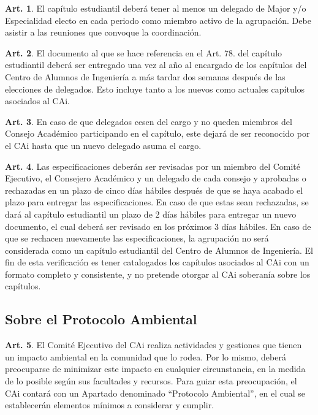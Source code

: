 \documentclass[letterpaper,11pt]{article}
\theoremstyle{definition}%
\newtheorem{art}{Art.} %
\begin{document}
\begin{art}
	El capítulo estudiantil deberá tener al menos un delegado de Major y/o Especialidad electo en cada periodo como miembro activo de la agrupación. Debe asistir a las reuniones que convoque la coordinación.
\end{art}

\begin{art}
	El documento al que se hace referencia en el Art. 78. del capítulo estudiantil deberá ser entregado una vez al año al encargado de los capítulos del Centro de Alumnos de Ingeniería a más tardar dos semanas después de las elecciones de delegados. Esto incluye tanto a los nuevos como actuales capítulos asociados al CAi.
\end{art}

\begin{art}
	En caso de que delegados cesen del cargo y no queden miembros del Consejo Académico participando en el capítulo, este dejará de ser reconocido por el CAi hasta que un nuevo delegado asuma el cargo.
\end{art}

\begin{art}
	Las especificaciones deberán ser revisadas por un miembro del Comité Ejecutivo, el Consejero Académico y un delegado de cada consejo y aprobadas o rechazadas en un plazo de cinco días hábiles después de que se haya acabado el plazo para entregar las especificaciones. En caso de que estas sean rechazadas, se dará al capítulo estudiantil un plazo de 2 días hábiles para entregar un nuevo documento, el cual deberá ser revisado en los próximos 3 días hábiles. En caso de que se rechacen nuevamente las especificaciones, la agrupación no será considerada como un capítulo estudiantil del Centro de Alumnos de Ingeniería. El fin de esta verificación es tener catalogados los capítulos asociados al CAi con un formato completo y consistente, y no pretende otorgar al CAi soberanía sobre los capítulos.
\end{art}

\subsection*{Sobre el Protocolo Ambiental}

\begin{art}\label{definicionProtocoloAmbiental}
	El Comité Ejecutivo del CAi realiza actividades y gestiones que tienen un impacto ambiental en la comunidad que lo rodea. Por lo mismo, deberá preocuparse de minimizar este impacto en cualquier circunstancia, en la medida de lo posible según sus facultades y recursos. Para guiar esta preocupación, el CAi contará con un Apartado denominado ``Protocolo Ambiental'', en el cual se establecerán elementos mínimos a considerar y cumplir.
\end{art}
\end{document}
